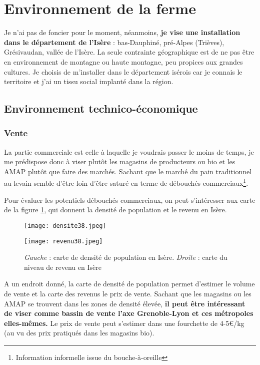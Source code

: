 \documentclass{article}
\begin{document}
\section{Environnement de la ferme}

Je n'ai pas de foncier pour le moment, néanmoins, \textbf{je vise une installation dans le département de l'Isère} : bas-Dauphiné, pré-Alpes (Trièves), Grésivaudan, vallée de l'Isère. La seule contrainte géographique est de ne pas être en environnement de montagne ou haute montagne, peu propices aux grandes cultures. Je choisis de m'installer dans le département isérois car je connais le territoire et j'ai un tissu social implanté dans la région.

\subsection{Environnement technico-économique}

\subsubsection*{Vente}

La partie commerciale est celle à laquelle je voudrais passer le moins de temps, je me prédispose donc à viser plutôt les magasins de producteurs ou bio et les AMAP plutôt que faire des marchés. Sachant que le marché du pain traditionnel au levain semble d'être loin d'être saturé en terme de débouchés commerciaux\footnote{Information informelle issue du bouche-à-oreille}. 

Pour évaluer les potentiels débouchés commerciaux, on peut s'intéresser aux carte de la figure \ref{fig:test}, qui donnent la densité de population et le revenu en Isère.

\begin{figure}[h!]
\centering
\begin{minipage}{.5\textwidth}
  \centering
  \texttt{[image: densite38.jpeg]}
\end{minipage}%
\begin{minipage}{.5\textwidth}
  \centering
  \texttt{[image: revenu38.jpeg]}
\end{minipage}
\caption{\textit{Gauche} : carte de densité de population en Isère. \textit{Droite} : carte du niveau de revenu en Isère}
\label{fig:test}
\end{figure}

A un endroit donné, la carte de densité de population permet d'estimer le volume de vente et la carte des revenus le prix de vente. Sachant que les magasins ou les AMAP se trouvent dans les zones de densité élevée, \textbf{il peut être intéressant de viser comme bassin de vente l'axe Grenoble-Lyon et ces métropoles elles-mêmes.} Le prix de vente peut s'estimer dans une fourchette de 4-5\euro{}/kg (au vu des prix pratiqués dans les magasins bio).
\end{document}
